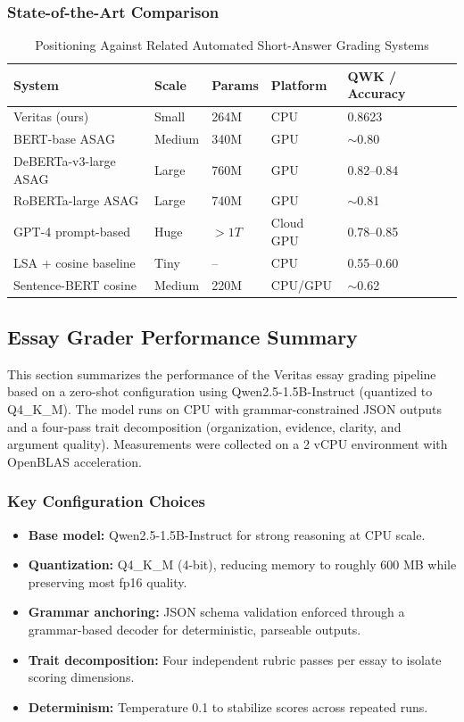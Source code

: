 \subsubsection{State-of-the-Art Comparison}
\renewcommand{\arraystretch}{1.15}
\setlength{\tabcolsep}{4pt}
\begin{table}[H]
\centering
\caption{Positioning Against Related Automated Short-Answer Grading Systems}
\label{tab:grading-sota-comparison}
\begin{tabular}{|p{3.6cm}|p{1.8cm}|p{2.0cm}|p{2.0cm}|p{3.6cm}|}
\hline
\textbf{System} & \textbf{Scale} & \textbf{Params} & \textbf{Platform} & \textbf{QWK / Accuracy} \\ \hline
Veritas (ours) & Small & 264M & CPU & 0.8623 \\ \hline
BERT-base ASAG & Medium & 340M & GPU & $\sim$0.80 \\ \hline
DeBERTa-v3-large ASAG & Large & 760M & GPU & 0.82--0.84 \\ \hline
RoBERTa-large ASAG & Large & 740M & GPU & $\sim$0.81 \\ \hline
GPT-4 prompt-based & Huge & $>1T$ & Cloud GPU & 0.78--0.85 \\ \hline
LSA + cosine baseline & Tiny & -- & CPU & 0.55--0.60 \\ \hline
Sentence-BERT cosine & Medium & 220M & CPU/GPU & $\sim$0.62 \\ \hline
\end{tabular}
\end{table}

\subsection{Essay Grader Performance Summary}
This section summarizes the performance of the Veritas essay grading pipeline based on a zero-shot configuration using Qwen2.5-1.5B-Instruct (quantized to Q4\_K\_M). The model runs on CPU with grammar-constrained JSON outputs and a four-pass trait decomposition (organization, evidence, clarity, and argument quality). Measurements were collected on a 2 vCPU environment with OpenBLAS acceleration.

\subsubsection{Key Configuration Choices}
\begin{itemize}
    \item \textbf{Base model:} Qwen2.5-1.5B-Instruct for strong reasoning at CPU scale.
    \item \textbf{Quantization:} Q4\_K\_M (4-bit), reducing memory to roughly 600 MB while preserving most fp16 quality.
    \item \textbf{Grammar anchoring:} JSON schema validation enforced through a grammar-based decoder for deterministic, parseable outputs.
    \item \textbf{Trait decomposition:} Four independent rubric passes per essay to isolate scoring dimensions.
    \item \textbf{Determinism:} Temperature 0.1 to stabilize scores across repeated runs.
\end{itemize}

